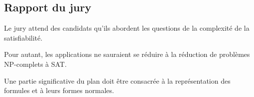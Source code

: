 \documentclass[../../Agregation.tex]{subfiles}
\begin{document}

\subsection{Rapport du jury}

\begin{aquote}{}
Le jury attend des candidats qu'ils abordent les questions de la complexité de la satisfiabilité.

Pour autant, les applications ne sauraient se réduire à la réduction de problèmes NP-complets à SAT.

Une partie significative du plan doit être consacrée à la représentation des formules et à leurs formes normales.
\end{aquote}
\end{document}
